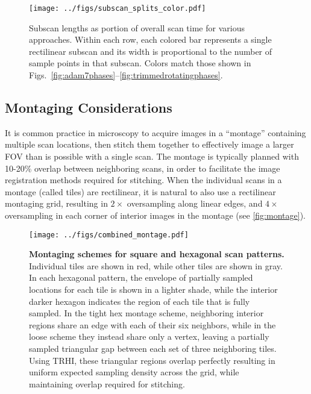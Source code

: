 \documentclass[aip, amsmath, amssymb, nobibnotes, nofootinbib, citeautoscript, reprint, superscriptaddress]{revtex4-1}
\begin{document}
    \begin{figure*}
        \centering
        \texttt{[image: ../figs/subscan\_splits\_color.pdf]}
        \caption{
        \label{fig:subscanlengths} 
        Subscan lengths as portion of overall scan time for various approaches.
        Within each row, each colored bar represents a single rectilinear subscan and its width is proportional to the number of sample points in that subscan.
            Colors match those shown in
            Figs.~\autoref{fig:adam7phases}--\autoref{fig:trimmedrotatingphases}.
        }
    \end{figure*}


    \subsection{Montaging Considerations}
    \label{sec:montaging}

    It is common practice in microscopy to acquire images in a
    ``montage'' containing multiple scan locations, then stitch them together to
    effectively image a larger FOV than is possible with a single scan.
    The montage is typically planned with 10-20\% overlap between neighboring scans,
    in order to facilitate the image registration methods required for stitching.
    When the individual scans in a montage (called tiles) are rectilinear, it is
    natural to also use a rectilinear montaging grid, resulting in $2\times$ oversampling
    along linear edges, and $4\times$ oversampling in each corner of interior images in
    the montage (see \autoref{fig:montage}).

    \begin{figure*}
        \centering
        \texttt{[image: ../figs/combined\_montage.pdf]}
        \caption{\label{fig:montage}\textbf{Montaging schemes for square and hexagonal scan patterns.}
        Individual tiles are shown in red, while other tiles are shown in gray.
        In each hexagonal pattern, the envelope of partially sampled locations for
        each tile is shown in a lighter shade, while the interior darker hexagon
        indicates the region of each tile that is fully sampled.
        In the tight hex montage scheme, neighboring interior regions share an edge
        with each of their six neighbors, while in the loose scheme they instead
        share only a vertex, leaving a partially sampled triangular gap between each
        set of three neighboring tiles.
        Using TRHI, these triangular regions overlap perfectly resulting in uniform
        expected sampling density across the grid, while maintaining overlap required for
        stitching.}
    \end{figure*}
\end{document}
